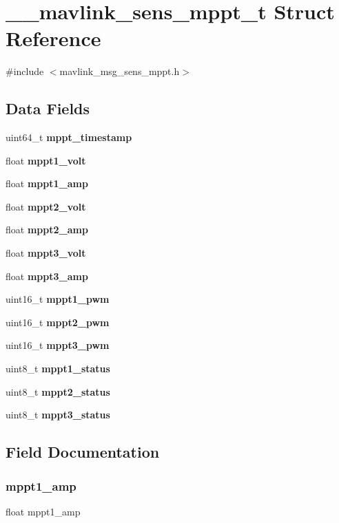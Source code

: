 \section{\+\_\+\+\_\+mavlink\+\_\+sens\+\_\+mppt\+\_\+t Struct Reference}
\label{struct____mavlink__sens__mppt__t}


{\ttfamily \#include $<$mavlink\+\_\+msg\+\_\+sens\+\_\+mppt.\+h$>$}

\subsection*{Data Fields}
\begin{DoxyCompactItemize}
\item 
uint64\+\_\+t \textbf{ mppt\+\_\+timestamp}
\item 
float \textbf{ mppt1\+\_\+volt}
\item 
float \textbf{ mppt1\+\_\+amp}
\item 
float \textbf{ mppt2\+\_\+volt}
\item 
float \textbf{ mppt2\+\_\+amp}
\item 
float \textbf{ mppt3\+\_\+volt}
\item 
float \textbf{ mppt3\+\_\+amp}
\item 
uint16\+\_\+t \textbf{ mppt1\+\_\+pwm}
\item 
uint16\+\_\+t \textbf{ mppt2\+\_\+pwm}
\item 
uint16\+\_\+t \textbf{ mppt3\+\_\+pwm}
\item 
uint8\+\_\+t \textbf{ mppt1\+\_\+status}
\item 
uint8\+\_\+t \textbf{ mppt2\+\_\+status}
\item 
uint8\+\_\+t \textbf{ mppt3\+\_\+status}
\end{DoxyCompactItemize}


\subsection{Field Documentation}
\mbox{\label{struct____mavlink__sens__mppt__t_aa5a81957e666b30b4030be9560a43d5d}} 
\subsubsection{mppt1\+\_\+amp}
{\footnotesize\ttfamily float mppt1\+\_\+amp}


